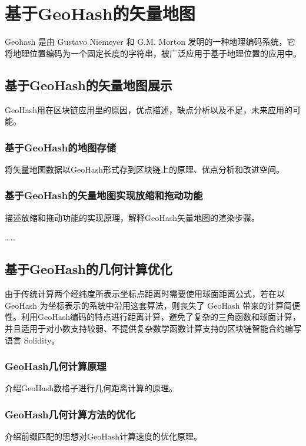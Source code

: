 \chapter{基于GeoHash的矢量地图}

Geohash 是由 Gustavo Niemeyer 和 G.M. Morton 发明的一种地理编码系统，它将地理位置编码为一个固定长度的字符串，被广泛应用于基于地理位置的应用中。

\section{基于GeoHash的矢量地图展示}
GeoHash用在区块链应用里的原因，优点描述，缺点分析以及不足，未来应用的可能。
\subsection{基于GeoHash的地图存储}
将矢量地图数据以GeoHash形式存到区块链上的原理、优点分析和改进空间。
\subsection{基于GeoHash的矢量地图实现放缩和拖动功能}
描述放缩和拖动功能的实现原理，解释GeoHash矢量地图的渲染步骤。

……

\section{基于GeoHash的几何计算优化}
由于传统计算两个经纬度所表示坐标点距离时需要使用球面距离公式，若在以 GeoHash 为坐标表示的系统中沿用这套算法，则丧失了 GeoHash 带来的计算简便性。利用GeoHash编码的特点进行距离计算，避免了复杂的三角函数和球面计算，并且适用于对小数支持较弱、不提供复杂数学函数计算支持的区块链智能合约编写语言 Solidity。
\subsection{GeoHash几何计算原理}
介绍GeoHash数格子进行几何距离计算的原理。
\subsection{GeoHash几何计算方法的优化}
介绍前缀匹配的思想对GeoHash计算速度的优化原理。